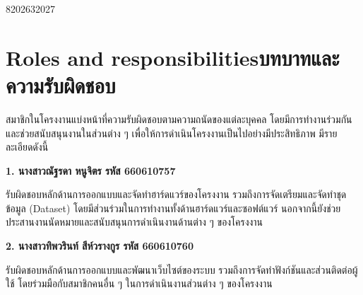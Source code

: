 \begin{plan}{8}{2026}{3}{2027}
    
    
    
    
    
    
    
    
    
    
\end{plan}

\section{\ifenglish Roles and responsibilities\else บทบาทและความรับผิดชอบ\fi}

สมาชิกในโครงงานแบ่งหน้าที่ความรับผิดชอบตามความถนัดของแต่ละบุคคล โดยมีการทำงานร่วมกันและช่วยสนับสนุนงานในส่วนต่าง ๆ เพื่อให้การดำเนินโครงงานเป็นไปอย่างมีประสิทธิภาพ มีรายละเอียดดังนี้

\textbf{1. นางสาวณัฐรดา หนูจิตร รหัส 660610757}

รับผิดชอบหลักด้านการออกแบบและจัดทำฮาร์ดแวร์ของโครงงาน รวมถึงการจัดเตรียมและจัดทำชุดข้อมูล (Dataset) โดยมีส่วนร่วมในการทำงานทั้งด้านฮาร์ดแวร์และซอฟต์แวร์ นอกจากนี้ยังช่วยประสานงานนัดหมายและสนับสนุนการดำเนินงานด้านต่าง ๆ ของโครงงาน

\textbf{2. นางสาวทิพวรินท์ สีห์วรางกูร รหัส 660610760}

รับผิดชอบหลักด้านการออกแบบและพัฒนาเว็บไซต์ของระบบ รวมถึงการจัดทำฟังก์ชันและส่วนติดต่อผู้ใช้ โดยร่วมมือกับสมาชิกคนอื่น ๆ ในการดำเนินงานส่วนต่าง ๆ ของโครงงาน

